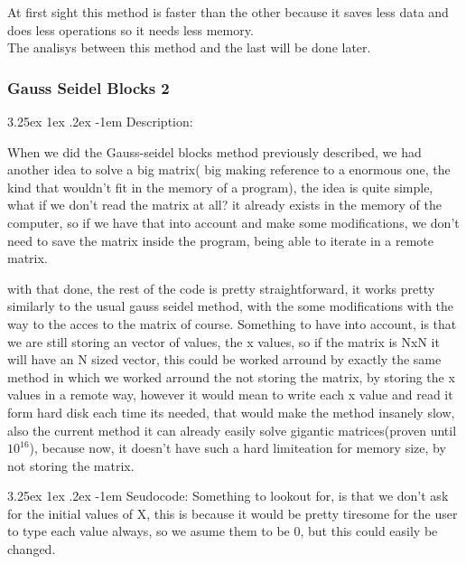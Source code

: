 \documentclass{article}
\makeatletter
\renewcommand\paragraph{\@startsection{paragraph}{5}{\z@}%
  {3.25ex \@plus1ex \@minus.2ex}%
  {-1em}%
  {\normalfont\normalsize\bfseries}}
\makeatother
\begin{document}
\hfill \break
At first sight this method is faster than the other because it saves less data and does less operations so it needs less memory.\\

The analisys between this method and the last will be done later.


\subsubsection{Gauss Seidel Blocks 2}

\paragraph{Description:}
\hfill \break

When we did the Gauss-seidel blocks method previously described, we had another idea to solve a big matrix( big making reference to a 
enormous one, the kind that wouldn't fit in the memory of a program), the idea is quite simple, what if we don't read the matrix at all?
it already exists in the memory of the computer, so if we have that into account and make some modifications, we don't need to save the matrix inside
the program, being able to iterate in a remote matrix.

with that done, the rest of the code is pretty straightforward, it works pretty similarly to the usual gauss seidel method, with the some modifications with the way
to the acces to the matrix of course. Something to have into account, is that we are still storing an vector of values, the x values, so if the matrix is NxN
it will have an N sized vector, this could be worked arround by exactly the same method in which we worked arround the not storing the matrix, by storing the x values in a remote way, however it would mean to
write each x value and read it form hard disk each time its needed, that would make the method insanely slow, also the current method it can already easily solve
gigantic matrices(proven until $10^{16}$), because now, it doesn't have such a hard limiteation for memory size, by not storing the
matrix.

\paragraph{Seudocode:}
\hfill \break
Something to lookout for, is that we don't ask for the initial values of X, this is because it
would be pretty tiresome for the user to type each value always, so we asume them to be 0, but
this could easily be changed.
\end{document}
